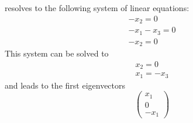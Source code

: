 \documentclass[12pt,a4paper]{report}
\begin{document}
resolves to the following system of linear equations:
\begin{eqnarray}
-x_2 = 0 \\
-x_1 -x_3 = 0 \\
-x_2 = 0
\end{eqnarray}
This system can be solved to
\begin{eqnarray}
x_2 = 0 \\
x_1 = -x_3
\end{eqnarray}
and leads to the first eigenvectors
\begin{equation}
\left( \begin{array}{c}
x_1 \\ 0 \\ -x_1
\end{array} \right)
\end{equation}
\end{document}
